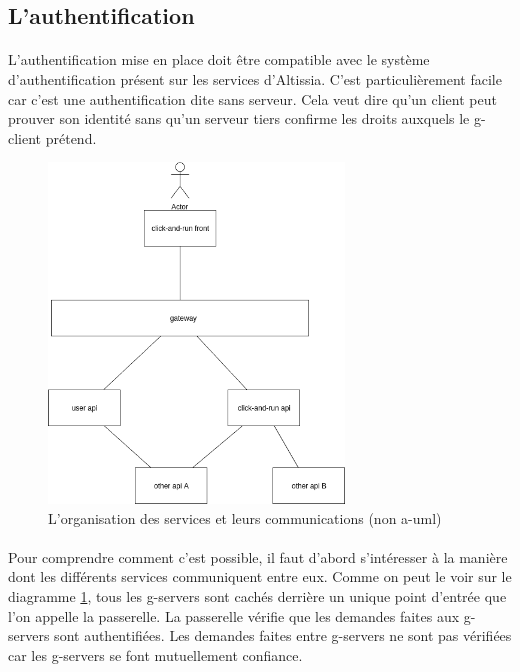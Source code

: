 \subsection{L'authentification}
\label{subsec:auth-feature}

\paragraph{}
L'authentification mise en place doit être compatible avec le système d'authentification présent sur les services d'Altissia. C'est particulièrement facile car c'est une authentification dite sans serveur. Cela veut dire qu'un client peut prouver son identité sans qu'un serveur tiers confirme les droits auxquels le \gls{g-client} prétend. 

\begin{figure}[h]
    \centering
    \includegraphics[width=0.7\textwidth]{images/diagrams/gw-archi.png}
    \caption{L'organisation des services et leurs communications (non \gls{a-uml})}
    \label{fig:gw-archi}
\end{figure}

\paragraph{}
Pour comprendre comment c'est possible, il faut d'abord s'intéresser à la manière dont les différents services communiquent entre eux. Comme on peut le voir sur le diagramme \ref{fig:gw-archi}, tous les \glspl{g-server} sont cachés derrière un unique point d'entrée que l'on appelle la passerelle. La passerelle vérifie que les demandes faites aux \glspl{g-server} sont authentifiées. Les demandes faites entre \glspl{g-server} ne sont pas vérifiées car les \glspl{g-server} se font mutuellement confiance.

